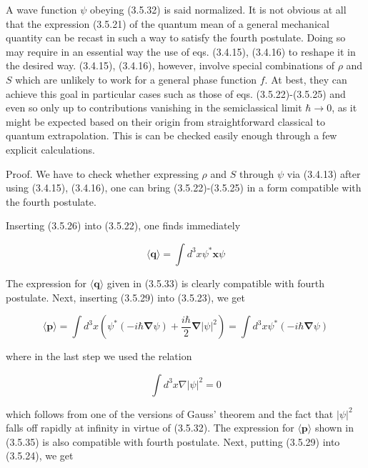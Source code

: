 \documentclass{article}
\begin{document}
A wave function $\psi$ obeying (3.5.32) is said normalized.
It is not obvious at all that the expression (3.5.21) of the quantum mean of a general mechanical quantity can be recast in such a way to satisfy the fourth postulate. Doing so may require in an essential way the use of eqs. (3.4.15), (3.4.16) to reshape it in the desired way. (3.4.15), (3.4.16), however, involve special combinations of $\rho$ and $S$ which are unlikely to work for a general phase function $f$. At best, they can achieve this goal in particular cases such as those of eqs. (3.5.22)-(3.5.25) and even so only up to contributions vanishing in the semiclassical limit $\hbar \rightarrow 0$, as it might be expected based on their origin from straightforward classical to quantum extrapolation. This is can be checked easily enough through a few explicit calculations.

Proof. We have to check whether expressing $\rho$ and $S$ through $\psi$ via (3.4.13) after using (3.4.15), (3.4.16), one can bring (3.5.22)-(3.5.25) in a form compatible with the fourth postulate.

Inserting (3.5.26) into (3.5.22), one finds immediately
 
\begin{equation*}
\langle\boldsymbol{q}\rangle=\int d^{3} x \psi^{*} \boldsymbol{x} \psi \tag{3.5.33}
\end{equation*}
 

The expression for $\langle\boldsymbol{q}\rangle$ given in (3.5.33) is clearly compatible with fourth postulate. Next, inserting (3.5.29) into (3.5.23), we get
 
\begin{equation*}
\langle\boldsymbol{p}\rangle=\int d^{3} x\left(\psi^{*}(-i \hbar \boldsymbol{\nabla} \psi)+\frac{i \hbar}{2} \boldsymbol{\nabla}|\psi|^{2}\right)=\int d^{3} x \psi^{*}(-i \hbar \boldsymbol{\nabla} \psi) \tag{3.5.34}
\end{equation*}
 
where in the last step we used the relation
 
\begin{equation*}
\int d^{3} x \nabla|\psi|^{2}=0 \tag{3.5.35}
\end{equation*}
 
which follows from one of the versions of Gauss' theorem and the fact that $|\psi|^{2}$ falls off rapidly at infinity in virtue of (3.5.32). The expression for $\langle\boldsymbol{p}\rangle$ shown in (3.5.35) is also compatible with fourth postulate. Next, putting (3.5.29) into (3.5.24), we get
 
\end{document}
